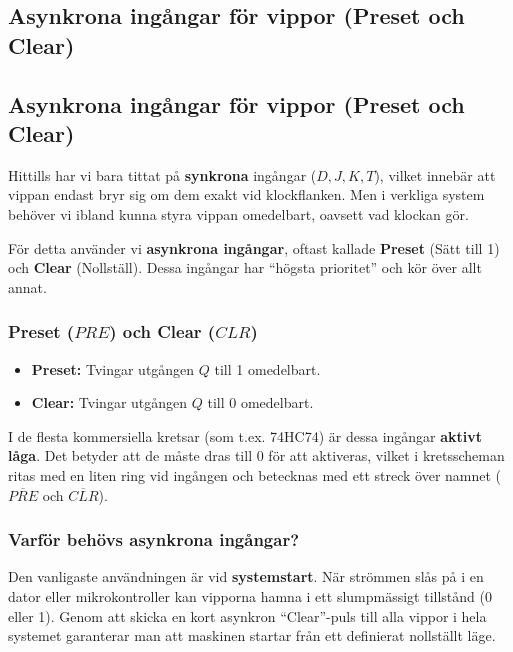 \documentclass[
  swedish,
  letterpaper,
  oneside,
  openany]{book}
\providecommand{\tightlist}{%
  \setlength{\itemsep}{0pt}\setlength{\parskip}{0pt}}
\begin{document}
\subsection{Asynkrona ingångar för vippor (Preset och
Clear)}\label{asynkrona-inguxe5ngar-fuxf6r-vippor-preset-och-clear}

\subsection{Asynkrona ingångar för vippor (Preset och
Clear)}\label{asynkrona-inguxe5ngar-fuxf6r-vippor-preset-och-clear-1}

Hittills har vi bara tittat på \textbf{synkrona} ingångar
(\(D, J, K, T\)), vilket innebär att vippan endast bryr sig om dem exakt
vid klockflanken. Men i verkliga system behöver vi ibland kunna styra
vippan omedelbart, oavsett vad klockan gör.

För detta använder vi \textbf{asynkrona ingångar}, oftast kallade
\textbf{Preset} (Sätt till 1) och \textbf{Clear} (Nollställ). Dessa
ingångar har ``högsta prioritet'' och kör över allt annat.

\subsubsection{\texorpdfstring{Preset (\(PRE\)) och Clear
(\(CLR\))}{Preset (PRE) och Clear (CLR)}}\label{preset-pre-och-clear-clr}

\begin{itemize}
\tightlist
\item
  \textbf{Preset:} Tvingar utgången \(Q\) till 1 omedelbart.
\item
  \textbf{Clear:} Tvingar utgången \(Q\) till 0 omedelbart.
\end{itemize}

I de flesta kommersiella kretsar (som t.ex. 74HC74) är dessa ingångar
\textbf{aktivt låga}. Det betyder att de måste dras till 0 för att
aktiveras, vilket i kretsscheman ritas med en liten ring vid ingången
och betecknas med ett streck över namnet (\(\overline{PRE}\) och
\(\overline{CLR}\)).

\subsubsection{Varför behövs asynkrona
ingångar?}\label{varfuxf6r-behuxf6vs-asynkrona-inguxe5ngar}

Den vanligaste användningen är vid \textbf{systemstart}. När strömmen
slås på i en dator eller mikrokontroller kan vipporna hamna i ett
slumpmässigt tillstånd (0 eller 1). Genom att skicka en kort asynkron
``Clear''-puls till alla vippor i hela systemet garanterar man att
maskinen startar från ett definierat nollställt läge.
\end{document}
